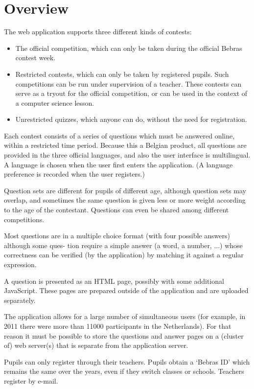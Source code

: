 
\section{Overview}

The web application supports three different kinds of contests:

\begin{itemize}
    \item The official competition, which can only be taken during the official
        Bebras contest week.
    \item Restricted contests, which can only be taken by registered pupils.
        Such competitions can be run under supervision of a teacher. These
        contests can serve as a tryout for the official competition, or can be
        used in the context of a computer science lesson.
    \item Unrestricted quizzes, which anyone can do, without the need for
        registration.
\end{itemize}

Each contest consists of a series of questions which must be answered online,
within a restricted time period. Because this a Belgian product, all questions
are provided in the three official languages, and also the user interface is
multilingual. A language is chosen when the user first enters the application.
(A language preference is recorded when the user registers.)

Question sets are different for pupils of different age, although question sets
may overlap, and sometimes the same question is given less or more weight
according to the age of the contestant.  Questions can even be shared among
different competitions.

Most questions are in a multiple choice format (with four possible answers)
although some ques- tion require a simple answer (a word, a number, ...) whose
correctness can be verified (by the application) by matching it against a
regular expression.

A question is presented as an HTML page, possibly with some additional
JavaScript. These pages are prepared outside of the application and are
uploaded separately.

The application allows for a large number of simultaneous users (for example,
in 2011 there were more than 11000 participants in the Netherlands). For that
reason it must be possible to store the questions and answer pages on a
(cluster of) web server(s) that is separate from the application server.

Pupils can only register through their teachers. Pupils obtain a `Bebras ID'
which remains the same over the years, even if they switch classes or schools.
Teachers register by e-mail.

